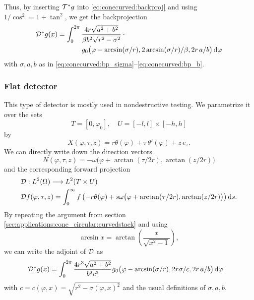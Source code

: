 \documentclass{amsart}
\renewcommand*{\phi}{\varphi}
\begin{document}
%
Thus, by inserting ${{\mathcal{T}}^*} g$ into \eqref{eq:conecurved:backproj} and using $1/\cos^2 = 1 + \tan^2$, we get the backprojection
%
\begin{align}
 \label{eq:conestack:backproj}
 \DUALOPD g(x)
 &= \int_0^{2\pi} \frac{4r \sqrt{a^2 + b^2}}{\beta b^2 \sqrt{r^2 - \sigma^2}} \cdot \phantom{x} \\
 &\hspace{35pt} g_0 \big( \phi - \arcsin(\sigma/r), 2\arcsin(\sigma/r)/\beta, 2r\, a/b \big)\, \D\phi \notag
\end{align}
%
with $\sigma, a, b$ as in \eqref{eq:conecurved:bp_sigma}--\eqref{eq:conecurved:bp_b}.
\vspace{5ex}%




\subsubsection{Flat detector}

This type of detector is mostly used in nondestructive testing. We parametrize it over the sets
%
\begin{equation}
 \label{eq:coneflat:params}
 T = [0, \phi_0], \quad U = [-l, l] \times [-h, h]
\end{equation}
%
by
%
\begin{equation}
 \label{eq:coneflat:detector_parametr}
 X(\phi, \tau, z) = r\theta(\phi) + \tau\, \theta'(\phi) + z\, e_z.
\end{equation} 
%
We can directly write down the direction vectors
%
\begin{equation}
 \label{eq:coneflat:direction_field}
 N(\phi, \tau, z) = - \omega\big(\phi + \arctan(\tau/2r), \arctan(z/2r)\big)
\end{equation}
%
and the corresponding forward projection
%
\begin{align*}
 &\OPD: L^2(\Omega) \Lto L^2(T \times U) \\
 \label{eq:coneflat:fwdproj}
 &\OPD f(\phi, \tau, z) = \int_0^\infty f\left( -r\theta(\phi) + s \omega\big(\phi + \arctan(\tau/2r), \arctan(z/2r)\big) \right) \D s.
\end{align*}
%
By repeating the argument from section \ref{sec:applications:cone_circular:curvedstack} and using
%
\begin{equation*}
 \arcsin x = \arctan\left( \frac{x}{\sqrt{x^2 - 1}} \right),
\end{equation*}
%
we can write the adjoint of ${\mathcal{D}}$ as
%
\begin{align}
 \label{eq:conestack:backproj}
 \DUALOPD g(x)
 &= \int_0^{2\pi} \frac{4r^3 \sqrt{a^2 + b^2}}{b^2 c^3} g_0 \big( \phi - \arcsin(\sigma/r), 2r \sigma/c, 2r\, a/b \big)\, \D\phi \notag
\end{align}
%
with $c = c(\phi, x) = \sqrt{r^2 - \sigma(\phi, x)^2}$ and the usual definitions of $\sigma, a, b$.
\vspace{5ex}%
\end{document}
